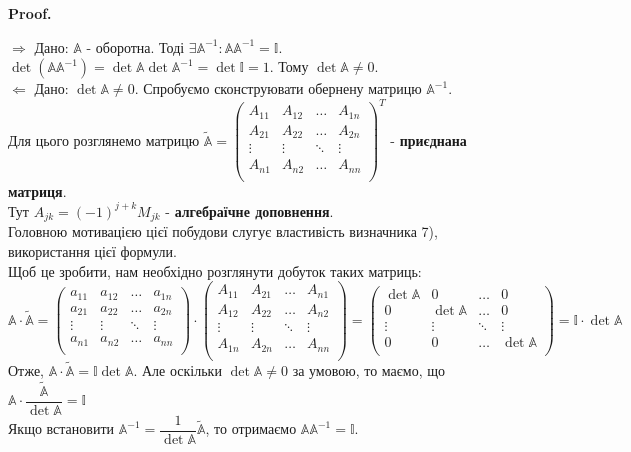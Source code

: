\documentclass[a4paper, 10pt]{article}
\makeatletter
\def\rightproof{$\boxed{\Rightarrow}$ }
\def\leftproof{$\boxed{\Leftarrow}$ }
\theoremstyle{theoremdd}
\renewenvironment{proof}[1][Proof.\\]{\par
\pushQED{\hfill \qed}%
\normalfont \topsep6\p@\@plus6\p@\relax
\trivlist
\item\relax
{\bfseries
#1\@addpunct{.}}\hspace\labelsep\ignorespaces
}{%
\popQED\endtrivlist\@endpefalse
}
\makeatother
\begin{document}
\begin{proof}
\rightproof Дано: $\mathbb{A}$ - оборотна. Тоді $\exists \mathbb{A}^{-1}: \mathbb{A} \mathbb{A}^{-1} = \mathbb{I}$.\\
$\det (\mathbb{A} \mathbb{A}^{-1}) = \det \mathbb{A} \det \mathbb{A}^{-1} = \det \mathbb{I} = 1$. Тому $\det \mathbb{A} \neq 0$.
\bigskip \\
\leftproof Дано: $\det \mathbb{A} \neq 0$. Спробуємо сконструювати обернену матрицю $\mathbb{A}^{-1}$.\\
Для цього розглянемо матрицю $\tilde{\mathbb{A}} = \begin{pmatrix}
A_{11} & A_{12} & \dots & A_{1n} \\
A_{21} & A_{22} & \dots & A_{2n} \\
\vdots & \vdots & \ddots & \vdots \\
A_{n1} & A_{n2} & \dots & A_{nn} \\
\end{pmatrix}^T$ - \textbf{приєднана матриця}.\\
Тут $A_{jk} = (-1)^{j+k}M_{jk}$ - \textbf{алгебраїчне доповнення}.\\
Головною мотивацією цієї побудови слугує властивість визначника 7), використання цієї формули.\\
Щоб це зробити, нам необхідно розглянути добуток таких матриць:\\
$\mathbb{A} \cdot \tilde{\mathbb{A}} = \begin{pmatrix}
a_{11} & a_{12} & \dots & a_{1n} \\
a_{21} & a_{22} & \dots & a_{2n} \\
\vdots & \vdots & \ddots & \vdots \\
a_{n1} & a_{n2} & \dots & a_{nn} \\
\end{pmatrix} \cdot \begin{pmatrix}
A_{11} & A_{21} & \dots & A_{n1} \\
A_{12} & A_{22} & \dots & A_{n2} \\
\vdots & \vdots & \ddots & \vdots \\
A_{1n} & A_{2n} & \dots & A_{nn} \\
\end{pmatrix} = \begin{pmatrix}
\det \mathbb{A} & 0 & \dots & 0 \\
0 & \det \mathbb{A} & \dots & 0 \\
\vdots & \vdots & \ddots & \vdots \\
0 & 0 & \dots & \det \mathbb{A} \\
\end{pmatrix} = \mathbb{I} \cdot \det \mathbb{A}$\\
Отже, $\mathbb{A} \cdot \tilde{\mathbb{A}} =\mathbb{I} \det \mathbb{A}$. Але оскільки $\det \mathbb{A} \neq 0$ за умовою, то маємо, що\\
$\mathbb{A} \cdot \dfrac{\tilde{\mathbb{A}}}{\det \mathbb{A}} = \mathbb{I}$\\
Якщо встановити $\mathbb{A}^{-1} = \dfrac{1}{\det \mathbb{A}} \tilde{\mathbb{A}}$, то отримаємо $\mathbb{A} \mathbb{A}^{-1} = \mathbb{I}$.
\end{proof}
\end{document}
